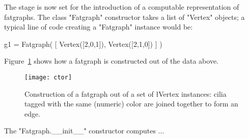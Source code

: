 The stage is now set for the introduction of a computable
representation of fatgraphs.  The class "Fatgraph" constructor takes a
list of "Vertex" objects; a typical line of code creating a "Fatgraph"
instance would be:
\begin{codexmp}
  g1 = Fatgraph( [ Vertex([2,0,1]), Vertex([2,1,0]) ] )
\end{codexmp}
Figure~\ref{fig:ctor} shows how a fatgraph is constructed out of the
data above.
\begin{figure}
  \centering
  \texttt{[image: ctor]}
  \caption{Construction of a fatgraph out of a set of {\l Vertex}
    instances: cilia tagged with the same (numeric) color are joined
    together to form an edge.}
  \label{fig:ctor}
\end{figure}
The "Fatgraph.__init__" constructor computes ...
